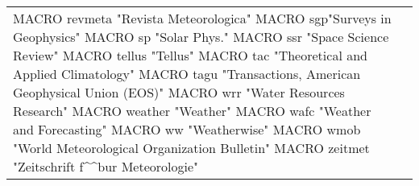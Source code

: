 \documentclass{article}
\begin{document}
\begin{longtable}{lp{6cm}}
MACRO {revmeta} {"Revista Meteorologica"}
MACRO {sgp}{"Surveys in Geophysics"}
MACRO {sp} {"Solar Phys."}
MACRO {ssr} {"Space Science Review"}
MACRO {tellus} {"Tellus"}
MACRO {tac} {"Theoretical and Applied Climatology"}
MACRO {tagu} {"Transactions, American Geophysical Union (EOS)"}
MACRO {wrr} {"Water Resources Research"}
MACRO {weather} {"Weather"}
MACRO {wafc} {"Weather and Forecasting"}
MACRO {ww} {"Weatherwise"}
MACRO {wmob} {"World Meteorological Organization Bulletin"}
MACRO {zeitmet} {"Zeitschrift f\^^b{u}r Meteorologie"}
\end{longtable}
\endgroup
\end{document}
